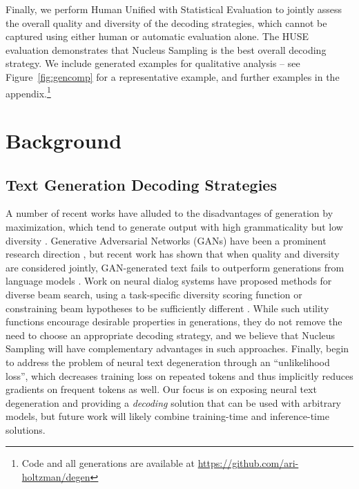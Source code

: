 Finally, we perform {Human Unified with Statistical Evaluation} \citep[HUSE;][]{hashimoto20190unifying} to jointly assess the overall quality and diversity of the decoding strategies, which cannot be captured using either human or automatic evaluation alone. The HUSE evaluation demonstrates that Nucleus Sampling is the best overall decoding strategy. We include generated examples for qualitative analysis -- see Figure~\ref{fig:gencomp} for a representative example, and further examples in the appendix.\footnote{Code and all generations are available at \url{https://github.com/ari-holtzman/degen}}
 \section{Background}

\subsection{Text Generation Decoding Strategies}

A number of recent works have alluded to the disadvantages of generation by maximization, which tend to generate output with high grammaticality but low diversity \citep{kulikov2018importance,holtzman2018l2w,fan2018hierarchical}. Generative Adversarial Networks (GANs) have been a prominent research direction \citep{Yu2017SeqGAN,xu2018diversity}, but recent work has shown that when quality and diversity are considered jointly, GAN-generated text fails to outperform generations from language models \citep{caccia2018GANs,Tevet2018GanLMs,semeniuta2018accurate}. Work on neural dialog systems have proposed methods for diverse beam search, using a task-specific diversity scoring function or constraining beam hypotheses to be sufficiently different \citep{li2016decoding,vijayakumar2018diverse,kulikov2018importance, 1661342}. While such utility functions encourage desirable properties in generations, they do not remove the need to choose an appropriate decoding strategy, and we believe that Nucleus Sampling will have complementary advantages in such approaches. Finally, \cite{welleck2019neural} begin to address the problem of neural text degeneration through an ``unlikelihood loss'', which decreases training loss on repeated tokens and thus implicitly reduces gradients on frequent tokens as well. Our focus is on exposing neural text degeneration and providing a \textit{decoding} solution that can be used with arbitrary models, but future work will likely combine training-time and inference-time solutions. 

